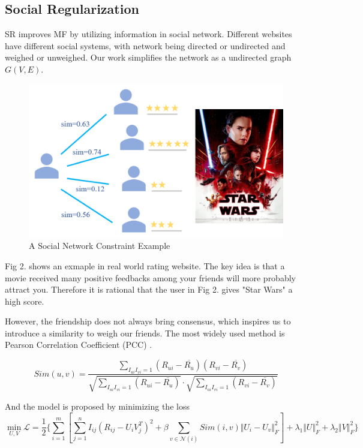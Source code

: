 \documentclass{article}
\begin{document}
\subsection{Social Regularization}
SR improves MF by utilizing information in social network. Different websites 
have different social systems, with network being directed or undirected and weighed 
or unweighed. Our work simplifies the network as a undirected graph $G(V, E)$. 

\begin{figure}[h]
  \centering
  \includegraphics[scale=0.35]{pic/figure2.png}
  \caption{A Social Network Constraint Example}
\end{figure}

Fig 2. shows an exmaple in real world rating website. The key idea is that a movie 
received many positive feedbacks among your friends will more probably attract you. 
Therefore it is rational that the user in Fig 2. gives "Star Wars" a high score. 

However, the friendship does not always bring consensus, which inspires us to introduce 
a similarity to weigh our friends. The most widely used method is 
Pearson Correlation Coefficient (PCC) \cite{bre1998pcc}.

\begin{equation}
  {Sim}(u, v) = \frac{\sum_{I_{ui} I_{vi} = 1} (R_{ui} - \overline{R_u}) (R_{vi} - \overline{R_v}) }
  {\sqrt{\sum_{I_{ui} I_{vi} = 1} (R_{ui} - \overline{R_u})} \cdot \sqrt{\sum_{I_{ui} I_{vi} = 1} (R_{vi} - \overline{R_v})}}
\end{equation}

And the model is proposed by minimizing the loss
\begin{equation}
  \min_{U, V} \mathcal{L} = \frac{1}{2} \{\sum_{i=1}^m [\sum_{j=1}^n I_{ij} (R_{ij} - U_iV_j^T)^2 + \beta \sum_{v \in \mathcal{N}(i)} {Sim}(i, v) \Vert U_i - U_v \Vert_F^2 ] + \lambda_1 \Vert U \Vert_F^2 + \lambda_2 \Vert V \Vert_F^2 \}
\end{equation}
\end{document}
